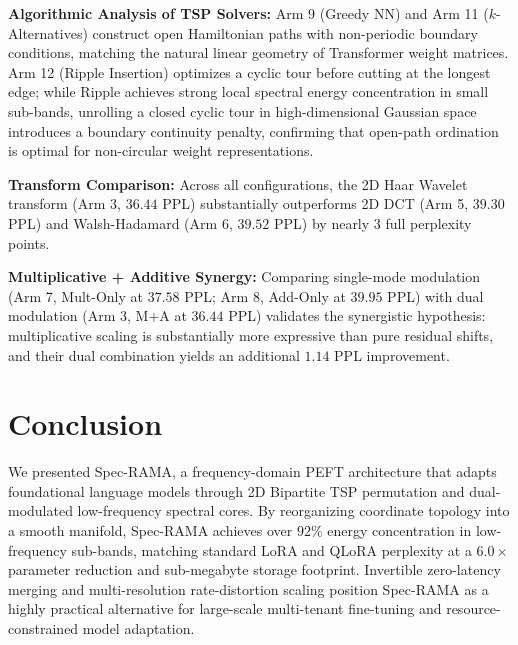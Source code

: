 \documentclass{article}
\begin{document}
\textbf{Algorithmic Analysis of TSP Solvers:} Arm 9 (Greedy NN) and Arm 11 ($k$-Alternatives) construct open Hamiltonian paths with non-periodic boundary conditions, matching the natural linear geometry of Transformer weight matrices. Arm 12 (Ripple Insertion) optimizes a cyclic tour before cutting at the longest edge; while Ripple achieves strong local spectral energy concentration in small sub-bands, unrolling a closed cyclic tour in high-dimensional Gaussian space introduces a boundary continuity penalty, confirming that open-path ordination is optimal for non-circular weight representations.

\textbf{Transform Comparison:} Across all configurations, the 2D Haar Wavelet transform (Arm 3, $36.44$ PPL) substantially outperforms 2D DCT (Arm 5, $39.30$ PPL) and Walsh-Hadamard (Arm 6, $39.52$ PPL) by nearly $3$ full perplexity points.

\textbf{Multiplicative + Additive Synergy:} Comparing single-mode modulation (Arm 7, Mult-Only at $37.58$ PPL; Arm 8, Add-Only at $39.95$ PPL) with dual modulation (Arm 3, M+A at $36.44$ PPL) validates the synergistic hypothesis: multiplicative scaling is substantially more expressive than pure residual shifts, and their dual combination yields an additional $1.14$ PPL improvement.

\section{Conclusion}

We presented Spec-RAMA, a frequency-domain PEFT architecture that adapts foundational language models through 2D Bipartite TSP permutation and dual-modulated low-frequency spectral cores. By reorganizing coordinate topology into a smooth manifold, Spec-RAMA achieves over $92\%$ energy concentration in low-frequency sub-bands, matching standard LoRA and QLoRA perplexity at a $6.0\times$ parameter reduction and sub-megabyte storage footprint. Invertible zero-latency merging and multi-resolution rate-distortion scaling position Spec-RAMA as a highly practical alternative for large-scale multi-tenant fine-tuning and resource-constrained model adaptation.



\end{document}
